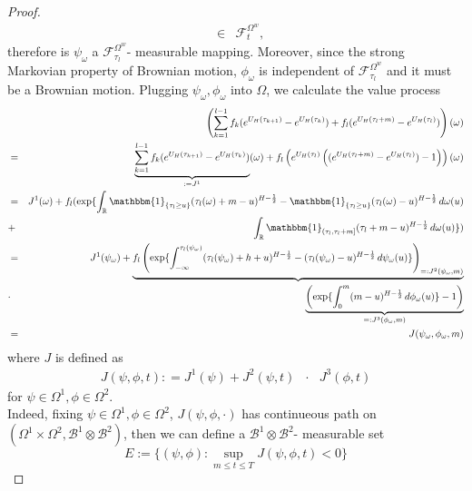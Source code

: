 \documentclass[a4paper, twoside, 11pt]{article}
\theoremstyle{definition}
\newcommand{\brkt}[1]{\left({#1} \right)}
\begin{document}
\begin{proof}
\begin{eqnarray*}
  &\in& \mathcal{F}^{\Omega^w}_t,
\end{eqnarray*}
therefore is $\psi_{\omega}$ a $\mathcal{F}^{\Omega^w}_{\tau_l}$- measurable mapping. Moreover, since the strong Markovian property of Brownian motion, $\phi_{\omega}$ is independent of $\mathcal{F}^{\Omega^w}_{\tau_l}$ and it must be a Brownian motion.  Plugging  $\psi_{\omega}, \phi_{\omega}$ into $\Omega$, we calculate the value process
\begin{eqnarray*}
  &&\brkt{\sum_{k=1}^{l-1} f_k (e^{U_H(\tau_{k+1})}  - e^{U_H(\tau_{k})}) + f_l(e^{U_H(\tau_l+m)}-e^{U_H(\tau_l)})} (\omega)  \\
  &=& \underbrace{\sum_{k=1}^{l-1} f_k (e^{U_H(\tau_{k+1})} - e^{U_H(\tau_{k})})}_{:=J^1} (\omega) + f_l\brkt{e^{U_H(\tau_l)}\brkt{(e^{U_H(\tau_l+m)}-e^{U_H(\tau_l)})-1}}(\omega)\\
  &=& J^1(\omega) + f_l(\exp\{\int_{\mathbb{R}}\mathbbm{1}_{\{\tau_l\ge u\}}(\tau_l(\omega)+m-u)^{H-\frac{1}{2}}-\mathbbm{1}_{\{\tau_l\ge u\}}(\tau_l(\omega)-u)^{H-\frac{1}{2}}\mathop{d\omega(u)}\\
&+& \int_{\mathbb{R}} \mathbbm{1}_{(\tau_l, \tau_l+m]}(\tau_l+m - u)^{H-\frac{1}{2}}\mathop{d\omega(u)}\})\\
&=&  J^1(\psi_{\omega}) + \underbrace{f_l\brkt{\exp\{\int_{-\infty}^{\tau_l(\psi_{\omega})}(\tau_l(\psi_{\omega})+h+u)^{H-\frac{1}{2}}-(\tau_l(\psi_{\omega})-u)^{H-\frac{1}{2}}\mathop{d\psi_{\omega}(u)}\}}_{=:J^2(\psi_{\omega}, m)}}\\
&\cdot&  \underbrace{\brkt{\exp\{\int_0^{m}(m-u)^{H-\frac{1}{2}}\mathop{d \phi_{\omega}(u)}\} - 1}}_{=:J^3(\phi_{\omega}, m)}\\
  &=& J(\psi_{\omega}, \phi_{\omega}, m)
\end{eqnarray*}
where $J$ is defined as
\begin{eqnarray*}
  J(\psi, \phi, t) : = J^1(\psi) + J^2(\psi, t)  &\cdot&  J^3(\phi, t)
\end{eqnarray*}
for $\psi\in\Omega^1, \phi\in\Omega^2$.\\

Indeed, fixing $\psi\in\Omega^1, \phi\in\Omega^2$, $J(\psi, \phi, \cdot)$ has continueous path on $(\Omega^1 \times \Omega^2, \mathscr{B}^1\otimes\mathscr{B}^2)$, then we can define a $\mathscr{B}^1\otimes\mathscr{B}^2$- measurable set
$$
E := \{(\psi, \phi) : \sup\limits_{m\le t\le T} J(\psi, \phi, t) < 0\}
$$


\end{proof}
\end{document}
